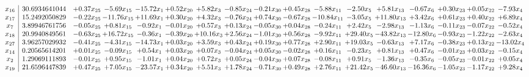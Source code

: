 \documentclass[9pt]{article}
\begin{document}
 \[\begin{array}{c| c c@{\hskip 2pt} c@{\hskip 2pt} c@{\hskip 2pt} c@{\hskip 2pt} c@{\hskip 2pt} c@{\hskip 2pt} c@{\hskip 2pt} c@{\hskip 2pt} c@{\hskip 2pt} c@{\hskip 2pt} c@{\hskip 2pt} c@{\hskip 2pt} c@{\hskip 2pt} c@{\hskip 2pt} c@{\hskip 2pt} }
 x_{16}   &  30.6934641044 & +  0.37 x_{25} & -5.69 x_{15} & -15.72 x_{1} & +  0.52 x_{20} & +  5.82 x_{3} & -0.85 x_{24} & -0.21 x_{30} & +  0.45 x_{28} & -5.88 x_{11} & -2.50 x_{5} & +  5.81 x_{13} & -0.67 x_{6} & +  0.30 x_{23} & +  0.05 x_{22} & -7.93 x_{4}\\
 x_{17}   &  15.2492050829 & -0.22 x_{25} & -11.76 x_{15} & + 11.69 x_{1} & +  0.30 x_{20} & +  4.32 x_{3} & -0.76 x_{24} & +  0.74 x_{30} & -0.67 x_{28} & -10.84 x_{11} & -3.05 x_{5} & + 11.80 x_{13} & +  3.42 x_{6} & +  0.61 x_{23} & +  0.40 x_{22} & +  6.89 x_{4}\\
 x_{7}   &  3.89946761756 & -0.05 x_{25} & +  0.81 x_{15} & -0.92 x_{1} & -0.01 x_{20} & +  0.57 x_{3} & +  0.13 x_{24} & -0.05 x_{30} & +  0.04 x_{28} & -0.24 x_{11} & +  2.42 x_{5} & -2.98 x_{13} & -1.13 x_{6} & -0.11 x_{23} & -0.07 x_{22} & -0.52 x_{4}\\
 x_{18}   &  20.9940849561 & -0.63 x_{25} & + 16.72 x_{15} & -0.36 x_{1} & -0.39 x_{20} & + 10.16 x_{3} & +  2.56 x_{24} & -1.01 x_{30} & +  0.56 x_{28} & -9.92 x_{11} & + 29.40 x_{5} & -43.82 x_{13} & -12.80 x_{6} & -0.93 x_{23} & -1.22 x_{22} & -2.63 x_{4}\\
 x_{27}   &  3.96257029932 & -0.41 x_{25} & -4.31 x_{15} & -14.73 x_{1} & +  0.03 x_{20} & +  3.59 x_{3} & +  0.43 x_{24} & +  0.19 x_{30} & +  0.77 x_{28} & +  2.90 x_{11} & + 19.03 x_{5} & -0.63 x_{13} & +  7.17 x_{6} & -0.38 x_{23} & +  0.13 x_{22} & -13.02 x_{4}\\
 x_{14}   &  0.20565614201 & +  0.01 x_{25} & -0.09 x_{15} & +  0.54 x_{1} & +  0.03 x_{20} & +  0.07 x_{3} & -0.04 x_{24} & +  0.05 x_{30} & -0.02 x_{28} & +  0.16 x_{11} & -0.23 x_{5} & +  0.81 x_{13} & +  0.47 x_{6} & -0.01 x_{23} & +  0.03 x_{22} & -0.15 x_{4}\\
 x_{2}   &  1.29069111893 & -0.01 x_{25} & +  0.95 x_{15} & -1.01 x_{1} & +  0.04 x_{20} & +  0.72 x_{3} & +  0.05 x_{24} & -0.04 x_{30} & +  0.07 x_{28} & -0.08 x_{11} & +  0.91 x_{5} & -1.36 x_{13} & -0.35 x_{6} & -0.05 x_{23} & -0.01 x_{22} & +  0.05 x_{4}\\
 x_{19}   &  21.6596447839 & +  0.47 x_{25} & +  7.05 x_{15} & -23.57 x_{1} & +  0.34 x_{20} & +  5.51 x_{3} & +  1.78 x_{24} & -0.71 x_{30} & +  0.49 x_{28} & +  2.76 x_{11} & + 21.42 x_{5} & -46.60 x_{13} & -16.36 x_{6} & -1.05 x_{23} & -1.17 x_{22} & +  9.28 x_{4}\\

\end{array}\]
\end{document}
